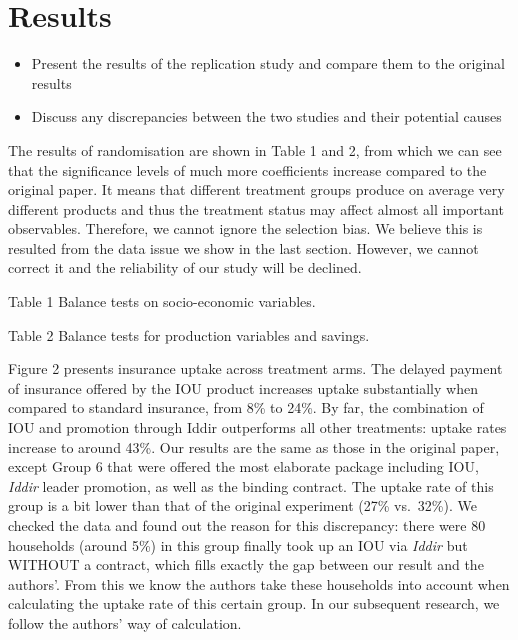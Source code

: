 \documentclass[AER]{AEA}
\begin{document}
\section{Results}

\begin{itemize}

\item Present the results of the replication study and compare them to the original results

\item Discuss any discrepancies between the two studies and their potential causes

\end{itemize}

The results of randomisation are shown in Table 1 and 2, from which we
can see that the significance levels of much more coefficients increase
compared to the original paper. It means that different treatment groups
produce on average very different products and thus the treatment status
may affect almost all important observables. Therefore, we cannot ignore
the selection bias. We believe this is resulted from the data issue we
show in the last section. However, we cannot correct it and the
reliability of our study will be declined.

Table 1 Balance tests on socio-economic variables.

Table 2 Balance tests for production variables and savings.

Figure 2 presents insurance uptake across treatment arms. The delayed
payment of insurance offered by the IOU product increases uptake
substantially when compared to standard insurance, from 8\% to 24\%. By
far, the combination of IOU and promotion through Iddir outperforms all
other treatments: uptake rates increase to around 43\%. Our results are
the same as those in the original paper, except Group 6 that were
offered the most elaborate package including IOU, \textit{Iddir} leader
promotion, as well as the binding contract. The uptake rate of this
group is a bit lower than that of the original experiment (27\%
vs.~32\%). We checked the data and found out the reason for this
discrepancy: there were 80 households (around 5\%) in this group finally
took up an IOU via \textit{Iddir} but WITHOUT a contract, which fills
exactly the gap between our result and the authors'. From this we know
the authors take these households into account when calculating the
uptake rate of this certain group. In our subsequent research, we follow
the authors' way of calculation.
\end{document}
